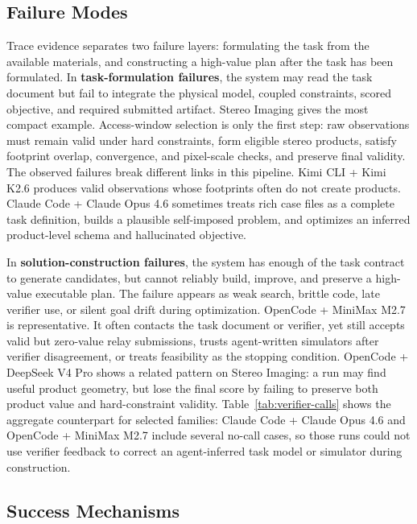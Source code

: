 \documentclass[11pt]{article}
\begin{document}
\subsection{Failure Modes}
\label{sec:what-fails}

Trace evidence separates two failure layers: formulating the task from the available materials, and constructing a high-value plan after the task has been formulated. In \textbf{task-formulation failures}, the system may read the task document but fail to integrate the physical model, coupled constraints, scored objective, and required submitted artifact. Stereo Imaging gives the most compact example. Access-window selection is only the first step: raw observations must remain valid under hard constraints, form eligible stereo products, satisfy footprint overlap, convergence, and pixel-scale checks, and preserve final validity. The observed failures break different links in this pipeline. Kimi CLI + Kimi K2.6 produces valid observations whose footprints often do not create products. Claude Code + Claude Opus 4.6 sometimes treats rich case files as a complete task definition, builds a plausible self-imposed problem, and optimizes an inferred product-level schema and hallucinated objective.

In \textbf{solution-construction failures}, the system has enough of the task contract to generate candidates, but cannot reliably build, improve, and preserve a high-value executable plan. The failure appears as weak search, brittle code, late verifier use, or silent goal drift during optimization. OpenCode + MiniMax M2.7 is representative. It often contacts the task document or verifier, yet still accepts valid but zero-value relay submissions, trusts agent-written simulators after verifier disagreement, or treats feasibility as the stopping condition. OpenCode + DeepSeek V4 Pro shows a related pattern on Stereo Imaging: a run may find useful product geometry, but lose the final score by failing to preserve both product value and hard-constraint validity. Table~\ref{tab:verifier-calls} shows the aggregate counterpart for selected families: Claude Code + Claude Opus 4.6 and OpenCode + MiniMax M2.7 include several no-call cases, so those runs could not use verifier feedback to correct an agent-inferred task model or simulator during construction.

\subsection{Success Mechanisms}
\label{sec:what-succeeds}
\end{document}
